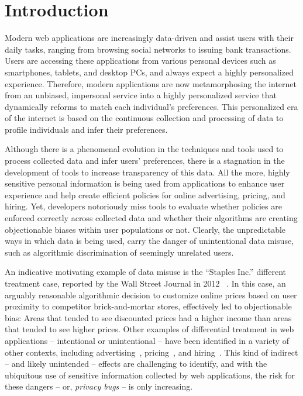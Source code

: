 
\section{Introduction}

Modern web applications are increasingly data-driven and assist users
with their daily tasks, ranging from browsing social networks to
issuing bank transactions. Users are accessing these applications from
various personal devices such as smartphones, tablets, and desktop PCs,
and always expect a highly personalized experience. Therefore, modern
applications are now metamorphosing the internet from an unbiased, impersonal
service into a highly personalized service that dynamically reforms to match
each individual's preferences. This personalized era of the internet
is based on the continuous collection and processing of data to profile individuals
and infer their preferences.

Although there is a phenomenal evolution in the techniques and tools used to
process collected data and infer users' preferences, there is a stagnation
in the development of tools to increase transparency of
this data. All the more,  highly sensitive personal information is being
used from applications to enhance user experience and help create efficient
policies for online advertising, pricing, and hiring.
Yet, developers notoriously miss tools to evaluate whether policies are
enforced correctly across collected data and whether their algorithms are
creating objectionable biases within user populations or not. Clearly,
the unpredictable ways in which data is being used, carry the danger of
unintentional data misuse, such as algorithmic discrimination of seemingly
unrelated users.

An indicative motivating example of data misuse is the ``Staples Inc.''
different treatment case, reported by the Wall Street Journal in 2012
~\cite{Staples}. In this case, an arguably reasonable algorithmic decision
to customize online prices based on user proximity to competitor
brick-and-mortar stores, effectively led to objectionable bias:
Areas that tended to see discounted prices had a higher income than areas
that tended to see higher prices. Other examples of differential treatment in
web applications -- intentional or unintentional -- have been identified in a
variety of other contexts, including
advertising~\cite{Sweeney:AdDiscrimination},
pricing~\cite{Hannak:PriceDiscrimination}, and
hiring~\cite{acquisiti:HiringDiscrimination}. This kind of indirect -- and likely
unintended -- effects are challenging to identify, and with the ubiquitous use
of sensitive information collected by web applications, the risk for these
dangers -- or, {\em privacy bugs} -- is only increasing.

